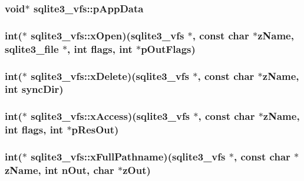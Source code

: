 \hypertarget{structsqlite3__vfs_1ba832cf207fe59c1fc8eb436524bc35}{
\subsubsection[pAppData]{\setlength{\rightskip}{0pt plus 5cm}void$\ast$ {\bf sqlite3\_\-vfs::pAppData}}}
\label{structsqlite3__vfs_1ba832cf207fe59c1fc8eb436524bc35}


\hypertarget{structsqlite3__vfs_5f35d5528d8fdf1d26e1e206879afbe1}{
\subsubsection[xOpen]{\setlength{\rightskip}{0pt plus 5cm}int($\ast$ {\bf sqlite3\_\-vfs::xOpen})({\bf sqlite3\_\-vfs} $\ast$, const char $\ast${\bf zName}, {\bf sqlite3\_\-file} $\ast$, int flags, int $\ast$pOutFlags)}}
\label{structsqlite3__vfs_5f35d5528d8fdf1d26e1e206879afbe1}


\hypertarget{structsqlite3__vfs_5f547a3e54f91c7ebef140d51054bbc0}{
\subsubsection[xDelete]{\setlength{\rightskip}{0pt plus 5cm}int($\ast$ {\bf sqlite3\_\-vfs::xDelete})({\bf sqlite3\_\-vfs} $\ast$, const char $\ast${\bf zName}, int syncDir)}}
\label{structsqlite3__vfs_5f547a3e54f91c7ebef140d51054bbc0}


\hypertarget{structsqlite3__vfs_b4344474034c2dbc9223a362c65ff235}{
\subsubsection[xAccess]{\setlength{\rightskip}{0pt plus 5cm}int($\ast$ {\bf sqlite3\_\-vfs::xAccess})({\bf sqlite3\_\-vfs} $\ast$, const char $\ast${\bf zName}, int flags, int $\ast$pResOut)}}
\label{structsqlite3__vfs_b4344474034c2dbc9223a362c65ff235}


\hypertarget{structsqlite3__vfs_02fafc56d26adab5f236df6493a8bd55}{
\subsubsection[xFullPathname]{\setlength{\rightskip}{0pt plus 5cm}int($\ast$ {\bf sqlite3\_\-vfs::xFullPathname})({\bf sqlite3\_\-vfs} $\ast$, const char $\ast${\bf zName}, int nOut, char $\ast$zOut)}}
\label{structsqlite3__vfs_02fafc56d26adab5f236df6493a8bd55}


